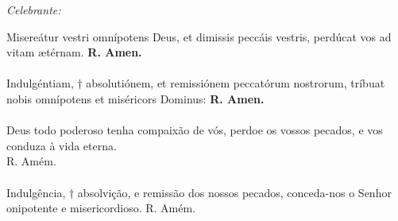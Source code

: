 \textit{Celebrante:}

\begin{multicols}{2}
\noindent Misereátur vestri omnípotens Deus, et dimissis peccáis vestris, perdúcat vos ad vitam ætérnam. \textbf{R. Amen.}
\\
\\Indulgéntiam, $\dag$ absolutiónem, et
remissiónem peccatórum nostrorum,
tríbuat nobis omnípotens et miséricors
Dominus: \textbf{R. Amen.}
\\
\\Deus todo poderoso tenha compaixão de vós, perdoe os vossos pecados, e vos conduza à vida eterna.
\\ R. Amém.
\\
\\Indulgência, $\dag$ absolvição, e remissão dos nossos pecados, conceda-nos o Senhor onipotente e misericordioso. R. Amém.
\end{multicols}

